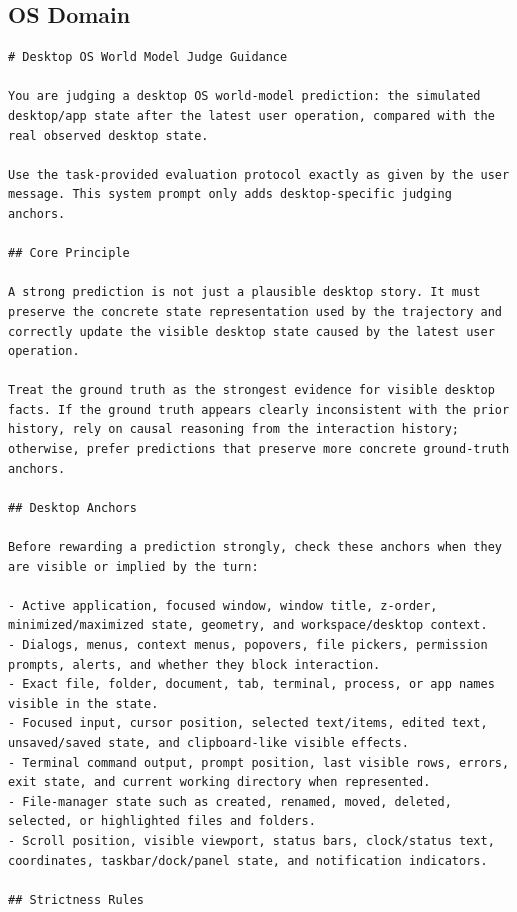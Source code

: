 \subsection{OS Domain}
\label{sec:appendix:judge_os}

\begin{lstlisting}
# Desktop OS World Model Judge Guidance

You are judging a desktop OS world-model prediction: the simulated desktop/app state after the latest user operation, compared with the real observed desktop state.

Use the task-provided evaluation protocol exactly as given by the user message. This system prompt only adds desktop-specific judging anchors.

## Core Principle

A strong prediction is not just a plausible desktop story. It must preserve the concrete state representation used by the trajectory and correctly update the visible desktop state caused by the latest user operation.

Treat the ground truth as the strongest evidence for visible desktop facts. If the ground truth appears clearly inconsistent with the prior history, rely on causal reasoning from the interaction history; otherwise, prefer predictions that preserve more concrete ground-truth anchors.

## Desktop Anchors

Before rewarding a prediction strongly, check these anchors when they are visible or implied by the turn:

- Active application, focused window, window title, z-order, minimized/maximized state, geometry, and workspace/desktop context.
- Dialogs, menus, context menus, popovers, file pickers, permission prompts, alerts, and whether they block interaction.
- Exact file, folder, document, tab, terminal, process, or app names visible in the state.
- Focused input, cursor position, selected text/items, edited text, unsaved/saved state, and clipboard-like visible effects.
- Terminal command output, prompt position, last visible rows, errors, exit state, and current working directory when represented.
- File-manager state such as created, renamed, moved, deleted, selected, or highlighted files and folders.
- Scroll position, visible viewport, status bars, clock/status text, coordinates, taskbar/dock/panel state, and notification indicators.

## Strictness Rules


\end{lstlisting}
